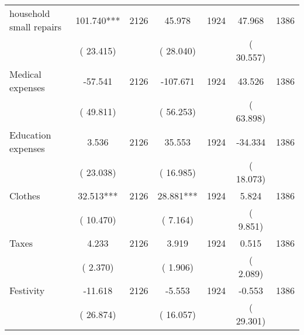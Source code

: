 \begin{tabular}{l*{6}{c}}
household small repairs        &            101.740***      &       2126       &             45.978      &       1924       &             47.968      &       1386       \\
                       &       (      23.415)            &                               &       (      28.040)            &                               &       (      30.557)            &                               \\
Medical expenses        &            -57.541      &       2126       &           -107.671      &       1924       &             43.526      &       1386       \\
                       &       (      49.811)            &                               &       (      56.253)            &                               &       (      63.898)            &                               \\
Education expenses        &              3.536      &       2126       &             35.553      &       1924       &            -34.334      &       1386       \\
                       &       (      23.038)            &                               &       (      16.985)            &                               &       (      18.073)            &                               \\
Clothes        &             32.513***      &       2126       &             28.881***      &       1924       &              5.824      &       1386       \\
                       &       (      10.470)            &                               &       (       7.164)            &                               &       (       9.851)            &                               \\
Taxes        &              4.233      &       2126       &              3.919      &       1924       &              0.515      &       1386       \\
                       &       (       2.370)            &                               &       (       1.906)            &                               &       (       2.089)            &                               \\
Festivity        &            -11.618      &       2126       &             -5.553      &       1924       &             -0.553      &       1386       \\
                       &       (      26.874)            &                               &       (      16.057)            &                               &       (      29.301)            &                               \\
\hline \end{tabular}